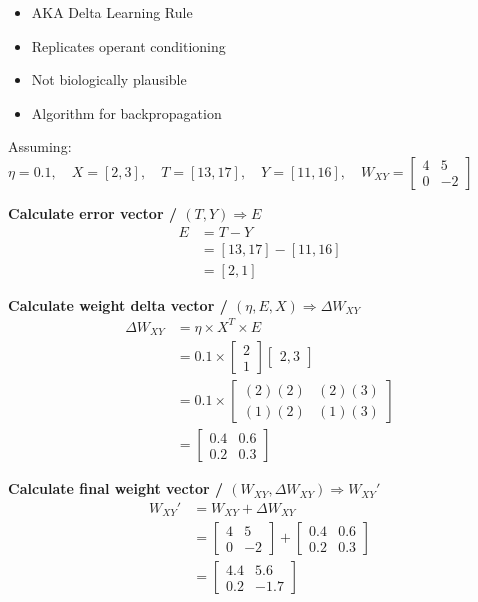 \documentclass[12 pt]{article}
\begin{document}
	\begin{itemize}
		\item AKA Delta Learning Rule
		\item Replicates operant conditioning
		\item Not biologically plausible
		\item Algorithm for backpropagation
	\end{itemize}

	Assuming:
		$
			\eta = 0.1,
			\quad X = [2, 3],
			\quad T = [13, 17],
			\quad Y = [11, 16],
			\quad W_{XY} = \begin{bmatrix}4 & 5\\0 & -2\end{bmatrix}
		$

	\textbf{Calculate error vector / $(T, Y) \Rightarrow E$}
	\begin{align*}
		E &= T - Y\\
		&= [13, 17] - [11, 16]\\
		&= [2, 1]
	\end{align*}

	\textbf{Calculate weight delta vector / $(\eta, E, X) \Rightarrow \Delta W_{XY}$}
	\begin{align*}
		\Delta W_{XY} &= \eta \times X^T \times E\\
		&= 0.1 \times \begin{bmatrix}2\\1\end{bmatrix} \begin{bmatrix}2,3\end{bmatrix}\\
		&= 0.1 \times \begin{bmatrix}(2)(2) & (2)(3)\\(1)(2) & (1)(3)\end{bmatrix}\\
		&= \begin{bmatrix}0.4 & 0.6\\0.2 & 0.3\end{bmatrix}
	\end{align*}
	
	\textbf{Calculate final weight vector / $(W_{XY}, \Delta W_{XY}) \Rightarrow W_{XY}'$}
	\begin{align*}
		W_{XY}' &= W_{XY} + \Delta W_{XY}\\
		&= \begin{bmatrix}4 & 5\\0 & -2\end{bmatrix} + \begin{bmatrix}0.4 & 0.6\\0.2 & 0.3\end{bmatrix}\\
		&= \begin{bmatrix}4.4 & 5.6\\0.2 & -1.7\end{bmatrix}
	\end{align*}
\end{document}

